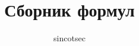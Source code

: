 \documentclass[fleqn, 12pt, a4paper, oneside, notitlepage]{book}
\begin{document}
\title{Сборник формул}
\author{sincotsec}
\date{}
\maketitle

\makeatletter\renewcommand\chapter{%
\thispagestyle{empty}\global\@topnum\z@\@afterindentfalse
\secdef\@chapter\@schapter}\makeatother

\tableofcontents

\makeatletter\renewcommand\chapter{%
\if@openright\cleardoublepage\else\clearpage\fi
\thispagestyle{plain}\global\@topnum\z@\@afterindentfalse
\secdef\@chapter\@schapter}\makeatother


























\end{document}
